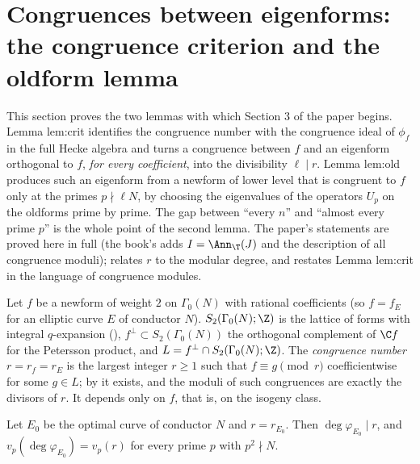 \section[The congruence criterion and the oldform lemma]{Congruences between eigenforms: the congruence criterion and the oldform lemma}\label{sec:modgalrep:congruences}

This section proves the two lemmas with which Section 3 of the paper begins. Lemma lem:crit identifies the congruence number with the
congruence ideal of $\phi_f$ in the full Hecke algebra and turns a congruence between $f$ and an eigenform orthogonal to $f$, \emph{for every
coefficient}, into the divisibility $\ell\mid r$. Lemma lem:old produces such an eigenform from a newform of lower level that is congruent to $f$ only at
the primes $p\nmid\ell N$, by choosing the eigenvalues of the operators $U_p$ on the oldforms prime by prime. The gap between ``every $n$'' and ``almost
every prime $p$'' is the whole point of the second lemma. The paper's statements are proved here in full (the book's  adds
$I=\Ann_\T(J)$ and the description of all congruence moduli);  relates $r$ to the modular degree, and  restates
Lemma lem:crit in the language of congruence modules.

\begin{definition}\label{def:modgalrep:congruence-number}
Let $f$ be a newform of weight $2$ on $\Gamma_0(N)$ with rational coefficients (so $f=f_E$ for an elliptic curve $E$ of conductor $N$). $S_2(\Gamma_0(N);\Z)$ is
the lattice of forms with integral $q$-expansion (), $f^\perp\subset S_2(\Gamma_0(N))$ the orthogonal complement of $\C f$ for the Petersson product,
and $L=f^\perp\cap S_2(\Gamma_0(N);\Z)$. The \emph{congruence number} $r=r_f=r_E$ is the largest integer $r\ge1$ such that $f\equiv g\pmod r$ coefficientwise for some
$g\in L$; by  it exists, and the moduli of such congruences are exactly the divisors of $r$. It depends only on $f$, that is, on
the isogeny class.
\end{definition}

\begin{theorem}\label{thm:modgalrep:ars}
Let $E_0$ be the optimal curve of conductor $N$ and $r=r_{E_0}$. Then $\deg\varphi_{E_0}\mid r$, and $v_p(\deg\varphi_{E_0})=v_p(r)$ for every prime $p$ with $p^2\nmid N$.
\end{theorem}


